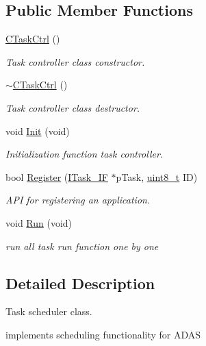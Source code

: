 \subsection*{Public Member Functions}
\begin{DoxyCompactItemize}
\item 
\mbox{\hyperlink{class_c_task_ctrl_a4d459479b49c5d6e1d07e9306748abe3}{C\+Task\+Ctrl}} ()
\begin{DoxyCompactList}\small\item\em Task controller class constructor. \end{DoxyCompactList}\item 
\mbox{\hyperlink{class_c_task_ctrl_a525a2b4438270d4ea5fce41e646c5b17}{$\sim$\+C\+Task\+Ctrl}} ()
\begin{DoxyCompactList}\small\item\em Task controller class destructor. \end{DoxyCompactList}\item 
void \mbox{\hyperlink{class_c_task_ctrl_a12ec6e8d4a490eba9ebdf22d32cf292b}{Init}} (void)
\begin{DoxyCompactList}\small\item\em Initialization function task controller. \end{DoxyCompactList}\item 
bool \mbox{\hyperlink{class_c_task_ctrl_a20457bd4d4a033c8aeeb44e9d4dc3c7c}{Register}} (\mbox{\hyperlink{class_i_task___i_f}{I\+Task\+\_\+\+IF}} $\ast$p\+Task, \mbox{\hyperlink{_a_d_a_s___types_8h_aba7bc1797add20fe3efdf37ced1182c5}{uint8\+\_\+t}} ID)
\begin{DoxyCompactList}\small\item\em A\+PI for registering an application. \end{DoxyCompactList}\item 
void \mbox{\hyperlink{class_c_task_ctrl_ab36ffef43b3bd33303ed7d068b2e89cf}{Run}} (void)
\begin{DoxyCompactList}\small\item\em run all task run function one by one \end{DoxyCompactList}\end{DoxyCompactItemize}


\subsection{Detailed Description}
Task scheduler class. 

implements scheduling functionality for A\+D\+AS 

